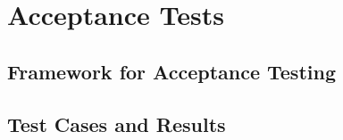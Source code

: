 \documentclass[11pt,fleqn]{book} %
\begin{document}
\thispagestyle{empty}
\part{Acceptance Tests}

\chapter{Framework for Acceptance Testing}
   \label{chap:acc-framework}
   
   \cleardoublepage
\chapter{Test Cases and Results}
   \label{chap:acc-tests}
   
   \cleardoublepage


%    

%    


%    
%    
\end{document}
